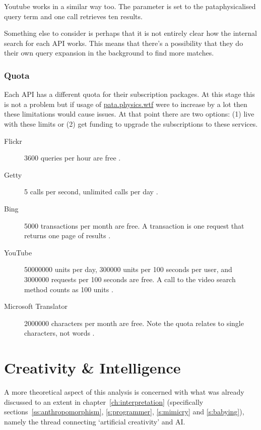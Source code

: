 Youtube works in a similar way too. The  parameter is set to the pataphysicalised query term and one call retrieves ten results.

Something else to consider is perhaps that it is not entirely clear how the internal search for each \ac{API} works. This means that there's a possibility that they do their own query expansion in the background to find more matches.


\subsubsection{Quota}
\label{s:quota}

Each \ac{API} has a different quota for their subscription packages. At this stage this is not a problem but if usage of \url{pata.physics.wtf} were to increase by a lot then these limitations would cause issues. At that point there are two options: (1) live with these limits or (2) get funding to upgrade the subscriptions to these services.

\begin{description}
  \item[Flickr] \num{3600} queries per hour are free \autocite{FlickrGuideAPI}.
  \item[Getty] \num{5} calls per second, unlimited calls per day \autocite{GettyOverviewAPI}.
  \item[Bing] \num{5000} transactions per month are free. A transaction is one request that returns one page of results \autocite{BingAzureAPI}.
  \item[YouTube] \num{50000000} units per day, \num{300000} units per \num{100} seconds per user, and \num{3000000} requests per \num{100} seconds are free. A call to the video search method counts as \num{100} units \autocite{YouTubeAPI}.
  \item[Microsoft Translator] \num{2000000} characters per month are free. Note the quota relates to single characters, not words \autocite{TranslatorAPI}.
\end{description}


\section{Creativity \& Intelligence}
\label{s:theoryanalysis}

A more theoretical aspect of this analysis is concerned with what was already discussed to an extent in chapter~\ref{ch:interpretation} (specifically sections~\ref{ss:anthropomorphism}, \ref{s:programmer}, \ref{s:mimicry} and \ref{s:babying}), namely the thread connecting `artificial creativity' and \acl{AI}.

